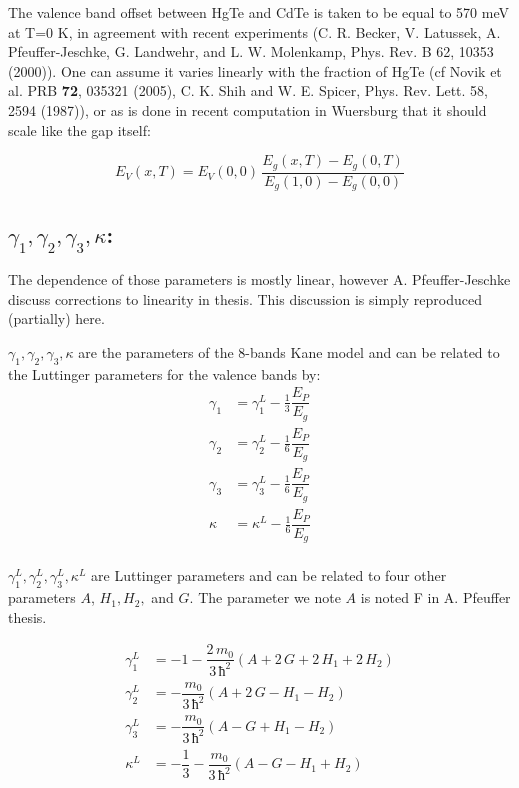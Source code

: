 \documentclass[prb,aps]{revtex4}
\begin{document}
        The valence band offset between HgTe and CdTe is taken to be equal to 570 meV at T=0 K, in  agreement  with  recent  experiments (C. R. Becker, V. Latussek, A. Pfeuffer-Jeschke, G. Landwehr, and L. W. Molenkamp, Phys. Rev. B 62, 10353 (2000)). One can assume it varies linearly with the fraction of HgTe (cf Novik et al. PRB {\bf 72}, 035321 (2005), C. K. Shih and W. E. Spicer, Phys. Rev. Lett. 58, 2594 (1987)), or as is done in recent computation in Wuersburg that it should scale like the gap itself:

        \begin{equation}
            E_V(x, T) = E_V(0, 0)\,\frac{E_g(x, T) - E_g(0, T)}{E_g(1, 0) - E_g(0, 0)}
        \end{equation}

    \subsection{$γ_1, γ_2, γ_3, κ$:}

        The dependence of those parameters is mostly linear, however A. Pfeuffer-Jeschke discuss corrections to linearity in thesis. This discussion is simply reproduced (partially) here.

        $γ_1, γ_2, γ_3, κ$ are the parameters of the 8-bands Kane model and can be related to the Luttinger parameters for the valence bands by:
        \begin{align}
            γ_1 &= γ_1^L - \frac13 \dfrac{E_P}{E_g}\\
            γ_2 &= γ_2^L - \frac16 \dfrac{E_P}{E_g}\\
            γ_3 &= γ_3^L - \frac16 \dfrac{E_P}{E_g}\\
            κ &= κ^L - \frac16 \dfrac{E_P}{E_g}\\
        \end{align}

        $γ_1^L, γ_2^L, γ_3^L, κ^L$ are Luttinger parameters and can be related to four other parameters $A$, $H_1, H_2,$ and $G$. The parameter we note $A$ is noted F in A. Pfeuffer thesis.

        \begin{align}
            γ_1^L &= - 1 - \dfrac{2\,m_0}{3\,ħ^2}\left(A + 2\,G + 2\,H_1 + 2\,H_2 \right)\\
            γ_2^L &= - \dfrac{m_0}{3\,ħ^2}\left( A + 2\,G - H_1 - H_2 \right)\\
            γ_3^L &= - \dfrac{m_0}{3\,ħ^2}\left( A - G + H_1 - H_2 \right)\\
            κ^L &= - \dfrac{1}{3} - \dfrac{m_0}{3\,ħ^2}\left( A - G - H_1 + H_2 \right)
        \end{align}
\end{document}
